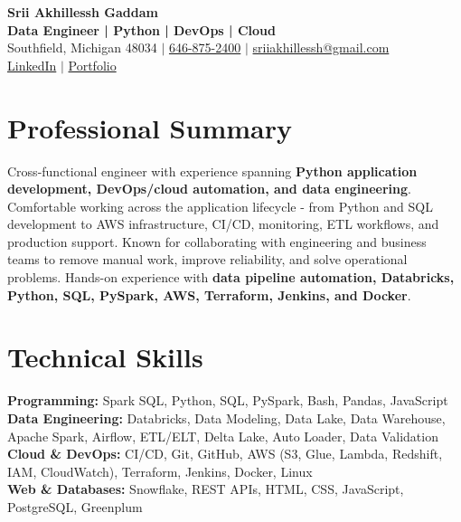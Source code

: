 \documentclass[letterpaper,10pt]{article}
\begin{document}
\fontsize{9.35pt}{10.45pt}\selectfont

\begin{center}
    {\LARGE \textbf{Srii Akhillessh Gaddam}} \\[-1pt]
    \textbf{Data Engineer | Python | DevOps | Cloud} \\[2pt]
    Southfield, Michigan 48034 $|$
    \href{tel:6468752400}{646-875-2400} $|$
    \href{mailto:sriiakhillessh@gmail.com}{sriiakhillessh@gmail.com} \\[1pt]
    \href{https://www.linkedin.com/in/srii-akhiilessh-gaddam-b48668191/}{LinkedIn} $|$
    \href{https://sriiakhillesshg.github.io/portfolio/}{Portfolio}
\end{center}
\vspace{-8pt}

\section{Professional Summary}
\small{Cross-functional engineer with experience spanning \textbf{Python application development, DevOps/cloud automation, and data engineering}. Comfortable working across the application lifecycle - from Python and SQL development to AWS infrastructure, CI/CD, monitoring, ETL workflows, and production support. Known for collaborating with engineering and business teams to remove manual work, improve reliability, and solve operational problems. Hands-on experience with \textbf{data pipeline automation, Databricks, Python, SQL, PySpark, AWS, Terraform, Jenkins, and Docker}.}

\section{Technical Skills}
\small{
\textbf{Programming:} Spark SQL, Python, SQL, PySpark, Bash, Pandas, JavaScript \\
\textbf{Data Engineering:} Databricks, Data Modeling, Data Lake, Data Warehouse, Apache Spark, Airflow, ETL/ELT, Delta Lake, Auto Loader, Data Validation \\
\textbf{Cloud \& DevOps:} CI/CD, Git, GitHub, AWS (S3, Glue, Lambda, Redshift, IAM, CloudWatch), Terraform, Jenkins, Docker, Linux \\
\textbf{Web \& Databases:} Snowflake, REST APIs, HTML, CSS, JavaScript, PostgreSQL, Greenplum
}
\end{document}
